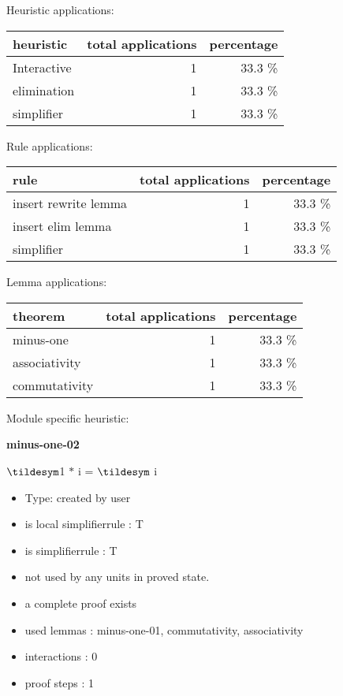 \documentclass[a4paper]{article}
\begin{document}
\medskip


Heuristic applications:

\begin{supertabular}{l|r|r}
heuristic	& total applications & percentage \\ \hline
Interactive & 1 & 33.3 \% \\
elimination & 1 & 33.3 \% \\
simplifier & 1 & 33.3 \% \\

\end{supertabular}

Rule applications:

\begin{supertabular}{l|r|r}
rule	        & total applications & percentage \\ \hline
insert rewrite lemma & 1 & 33.3 \% \\
insert elim lemma & 1 & 33.3 \% \\
simplifier & 1 & 33.3 \% \\

\end{supertabular}

Lemma applications:

\begin{supertabular}{l|r|r}
theorem	        & total applications & percentage \\ \hline
minus-one & 1 & 33.3 \% \\
associativity & 1 & 33.3 \% \\
commutativity & 1 & 33.3 \% \\

\end{supertabular}

Module specific heuristic:

\pagebreak

{\LARGE\bf minus-one-02}\label{lemma-minus-one-02}

\medskip

 \Fol $\tildesym$1 $*$ i = $\tildesym$ i

\begin{itemize}

\item Type: created by user

\item is local simplifierrule : T
\item is simplifierrule : T
\item not used by any units in proved state.
\item       a complete proof exists
\item       used lemmas  : minus-one-01, commutativity, associativity
\item       interactions : 0
\item       proof steps  : 1
\end{itemize}
\end{document}
